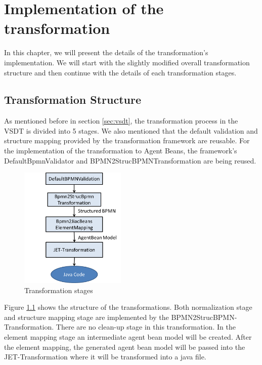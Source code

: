 \chapter{Implementation of the transformation}
\label{chap:implementation}
In this chapter, we will present the details of the transformation's implementation. We will start with the slightly modified overall transformation structure and then continue with the details of each transformation stages.

\section{Transformation Structure}
As mentioned before in section \ref{sec:vsdt}, the transformation process in the VSDT is divided into 5 stages. We also mentioned that the default validation and structure mapping provided by the transformation framework are reusable. For the implementation of the transformation to Agent Beans, the framework's DefaultBpmnValidator and BPMN2StrucBPMNTransformation are being reused. 
\begin{figure}[h]
	\centering	\includegraphics[width=0.45\textwidth]{images/implementation_stages.png}
	\caption{Transformation stages}
	\label{fig:implementation_stages}
\end{figure}

Figure \ref{fig:implementation_stages} shows the structure of the transformations. Both normalization stage and structure mapping stage are implemented by the BPMN2StrucBPMN-Transformation. There are no clean-up stage in this transformation. In the element mapping stage an intermediate agent bean model will be created. After the element mapping, the generated agent bean model will be passed into the JET-Transformation where it will be transformed into a java file.

